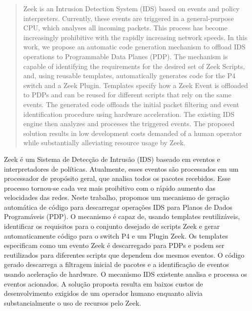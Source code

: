 \begin{abstract}
Zeek is an Intrusion Detection System (IDS) based on events and policy interpreters. Currently, these events are triggered in a general-purpose CPU, which analyses all incoming packets. This process has become increasingly prohibitive with the rapidly increasing network speeds. In this work, we propose an automatic code generation mechanism to offload IDS operations to Programmable Data Planes (PDP). The mechanism is capable of identifying the requirements for the desired set of Zeek Scripts, and, using reusable templates, automatically generates code for the P4 switch and a Zeek Plugin. Templates specify how a Zeek Event is offloaded to PDPs and can be reused for different scripts that rely on the same events. The generated code offloads the initial packet filtering and event identification procedure using hardware acceleration. The existing IDS engine then analyzes and processes the triggered events. The proposed solution results in low development costs demanded of a human operator while substantially alleviating resource usage by Zeek.
\end{abstract}

\begin{translatedabstract}
Zeek é um Sistema de Detecção de Intrusão (IDS) baseado em eventos e interpretadores de políticas. Atualmente, esses eventos são processados em um processador de propósito geral, que analisa todos os pacotes recebidos. Esse processo tornou-se cada vez mais proibitivo com o rápido aumento das velocidades das redes. Neste trabalho, propomos um mecanismo de geração automática de código para descarregar operações IDS para Planos de Dados Programáveis (PDP). O mecanismo é capaz de, usando templates reutilizáveis, identificar os requisitos para o conjunto desejado de scripts Zeek e gerar automaticamente código para o switch P4 e um Plugin Zeek. Os templates especificam como um evento Zeek é descarregado para PDPs e podem ser reutilizados para diferentes scripts que dependem dos mesmos eventos. O código gerado descarrega a filtragem inicial de pacotes e a identificação de eventos usando aceleração de hardware. O mecanismo IDS existente analisa e processa os eventos acionados. A solução proposta resulta em baixos custos de desenvolvimento exigidos de um operador humano enquanto alivia substancialmente o uso de recursos pelo Zeek.
\end{translatedabstract}
